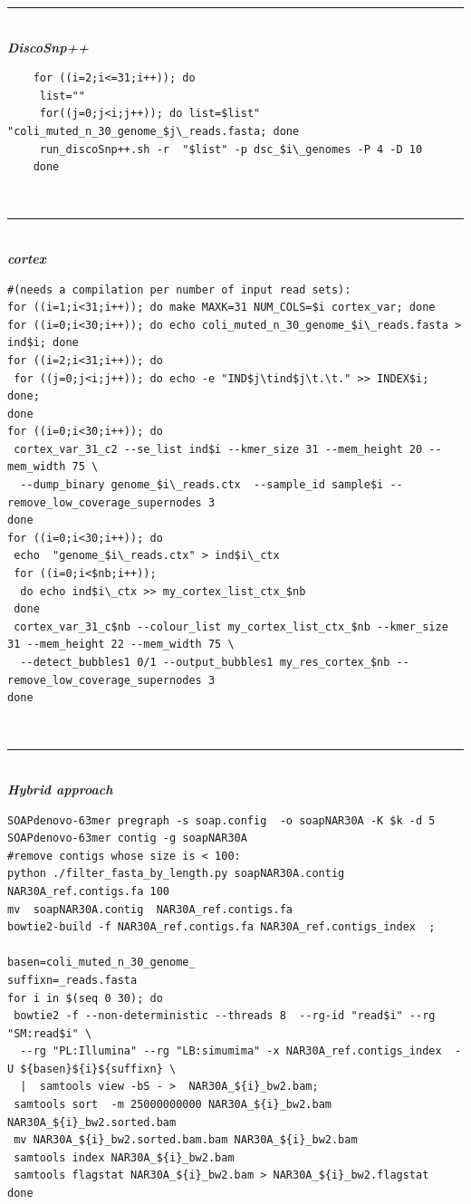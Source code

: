 \documentclass{bmcart}
\newcommand{\discopp}{{\it DiscoSnp++}\xspace}
\newcommand{\co}{{\it cortex}\xspace}
\begin{document}
\begin{table}[ht]
	\hrule~\\
\emph\textbf{{\discopp}}
	\scriptsize\begin{verbatim}
	for ((i=2;i<=31;i++)); do
	 list=""
	 for((j=0;j<i;j++)); do list=$list" "coli_muted_n_30_genome_$j\_reads.fasta; done
	 run_discoSnp++.sh -r  "$list" -p dsc_$i\_genomes -P 4 -D 10
	done
	\end{verbatim}	\normalsize
~\hrule~\\
\emph\textbf{{\co}}
\scriptsize\begin{verbatim}
#(needs a compilation per number of input read sets):
for ((i=1;i<31;i++)); do make MAXK=31 NUM_COLS=$i cortex_var; done 
for ((i=0;i<30;i++)); do echo coli_muted_n_30_genome_$i\_reads.fasta > ind$i; done
for ((i=2;i<31;i++)); do 
 for ((j=0;j<i;j++)); do echo -e "IND$j\tind$j\t.\t." >> INDEX$i; done; 
done
for ((i=0;i<30;i++)); do
 cortex_var_31_c2 --se_list ind$i --kmer_size 31 --mem_height 20 --mem_width 75 \ 
  --dump_binary genome_$i\_reads.ctx  --sample_id sample$i --remove_low_coverage_supernodes 3
done
for ((i=0;i<30;i++)); do
 echo  "genome_$i\_reads.ctx" > ind$i\_ctx
 for ((i=0;i<$nb;i++));
  do echo ind$i\_ctx >> my_cortex_list_ctx_$nb
 done
 cortex_var_31_c$nb --colour_list my_cortex_list_ctx_$nb --kmer_size 31 --mem_height 22 --mem_width 75 \
  --detect_bubbles1 0/1 --output_bubbles1 my_res_cortex_$nb --remove_low_coverage_supernodes 3 
done
	\end{verbatim}	\normalsize
~\hrule~\\
\emph\textbf{Hybrid approach}
\scriptsize\begin{verbatim}
SOAPdenovo-63mer pregraph -s soap.config  -o soapNAR30A -K $k -d 5 
SOAPdenovo-63mer contig -g soapNAR30A
#remove contigs whose size is < 100:
python ./filter_fasta_by_length.py soapNAR30A.contig NAR30A_ref.contigs.fa 100 
mv  soapNAR30A.contig  NAR30A_ref.contigs.fa
bowtie2-build -f NAR30A_ref.contigs.fa NAR30A_ref.contigs_index  ;

basen=coli_muted_n_30_genome_
suffixn=_reads.fasta
for i in $(seq 0 30); do
 bowtie2 -f --non-deterministic --threads 8  --rg-id "read$i" --rg "SM:read$i" \
  --rg "PL:Illumina" --rg "LB:simumima" -x NAR30A_ref.contigs_index  -U ${basen}${i}${suffixn} \
  |  samtools view -bS - >  NAR30A_${i}_bw2.bam;
 samtools sort  -m 25000000000 NAR30A_${i}_bw2.bam NAR30A_${i}_bw2.sorted.bam
 mv NAR30A_${i}_bw2.sorted.bam.bam NAR30A_${i}_bw2.bam
 samtools index NAR30A_${i}_bw2.bam
 samtools flagstat NAR30A_${i}_bw2.bam > NAR30A_${i}_bw2.flagstat
done


\end{verbatim}
\end{table}
\end{document}
